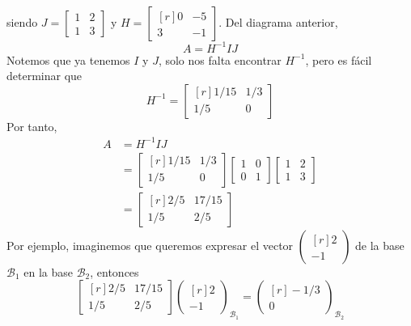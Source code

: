 \begin{example}
\begin{center}
    \end{center}\newpage\noindent
    siendo $J = \begin{bmatrix}
        1 & 2 \\
        1 & 3
    \end{bmatrix}$ y $H = \begin{bmatrix*}[r]
        0 & -5 \\
        3 & -1
    \end{bmatrix*}$. Del diagrama anterior,
    $$A = H^{-1}IJ$$
    Notemos que ya tenemos $I$ y $J$, solo nos falta encontrar $H^{-1}$, pero es fácil determinar que
    $$H^{-1} = \begin{bmatrix*}[r]
        1/15 & 1/3 \\
        1/5 & 0
    \end{bmatrix*}$$
    Por tanto,
    \begin{align*}
        A & = H^{-1}IJ \\
        & = \begin{bmatrix*}[r]
            1/15 & 1/3 \\
            1/5 & 0
        \end{bmatrix*} \begin{bmatrix}
            1 & 0 \\
            0 & 1
        \end{bmatrix} \begin{bmatrix}
            1 & 2 \\
            1 & 3
        \end{bmatrix} \\
        & = \begin{bmatrix*}[r]
            2/5 & 17/15 \\
            1/5 & 2/5
        \end{bmatrix*}
    \end{align*}
    Por ejemplo, imaginemos que queremos expresar el vector $\begin{pmatrix*}[r]
        2 \\
        -1
    \end{pmatrix*}$ de la base $\mathcal{B}_1$ en la base $\mathcal{B}_2$, entonces
    $$\begin{bmatrix*}[r]
        2/5 & 17/15 \\
        1/5 & 2/5
    \end{bmatrix*} \begin{pmatrix*}[r]
        2 \\
        -1
    \end{pmatrix*}_{\mathcal{B}_1} = \begin{pmatrix*}[r]
        -1/3 \\
        0
    \end{pmatrix*}_{\mathcal{B}_2}$$
\end{example}


